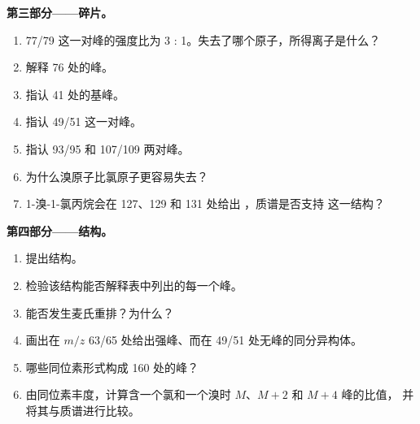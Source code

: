 \begin{problem}
\medskip
\noindent\textbf{第三部分——碎片。}
\begin{enumerate}[resume]
  \item 77/79 这一对峰的强度比为 3 : 1。失去了哪个原子，所得离子是什么？
  \item 解释 76 处的峰。
  \item 指认 41 处的基峰。
  \item 指认 49/51 这一对峰。
  \item 指认 93/95 和 107/109 两对峰。
  \item 为什么溴原子比氯原子更容易失去？
  \item 1-溴-1-氯丙烷会在 127、129 和 131 处给出 ，质谱是否支持
        这一结构？
\end{enumerate}

\medskip
\noindent\textbf{第四部分——结构。}
\begin{enumerate}[resume]
  \item 提出结构。
  \item 检验该结构能否解释表中列出的每一个峰。
  \item 能否发生麦氏重排？为什么？
  \item 画出在 $m/z$ 63/65 处给出强峰、而在 49/51 处无峰的同分异构体。
  \item 哪些同位素形式构成 160 处的峰？
  \item 由同位素丰度，计算含一个氯和一个溴时 $M$、$M+2$ 和 $M+4$ 峰的比值，
        并将其与质谱进行比较。
\end{enumerate}
\end{problem}
